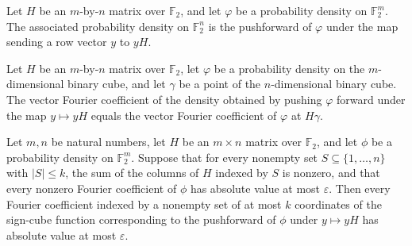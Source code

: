 \begin{definition}
\label{FABL.matrixPushforwardDensity}
\leanok
{}
Let $H$ be an $m$-by-$n$ matrix over $\mathbb{F}_2$, and let $\varphi$ be a probability
density on $\mathbb{F}_2^m$. The associated probability density on $\mathbb{F}_2^n$ is
the pushforward of $\varphi$ under the map sending a row vector $y$ to $yH$.
\end{definition}

\begin{theorem}
\label{FABL.vectorFourierCoeff_matrixPushforwardDensity}
\leanok
{}
Let $H$ be an $m$-by-$n$ matrix over $\mathbb{F}_2$, let $\varphi$ be a probability
density on the $m$-dimensional binary cube, and let $\gamma$ be a point of the
$n$-dimensional binary cube. The vector Fourier coefficient of the density obtained by
pushing $\varphi$ forward under the map $y\mapsto yH$ equals the vector Fourier
coefficient of $\varphi$ at $H\gamma$.
\end{theorem}

\begin{theorem}
\label{FABL.matrixPushforwardDensity_isApproximatelyKWiseIndependent}
\leanok
{}
Let $m,n$ be natural numbers, let $H$ be an $m\times n$ matrix over $\mathbb{F}_2$, and
let $\phi$ be a probability density on $\mathbb{F}_2^m$. Suppose that for every nonempty
set $S\subseteq\{1,\ldots,n\}$ with $|S|\le k$, the sum of the columns of $H$ indexed by
$S$ is nonzero, and that every nonzero Fourier coefficient of $\phi$ has absolute value
at most $\varepsilon$. Then every Fourier coefficient indexed by a nonempty set of at
most $k$ coordinates of the sign-cube function corresponding to the pushforward of
$\phi$ under $y\mapsto yH$ has absolute value at most $\varepsilon$.
\end{theorem}
